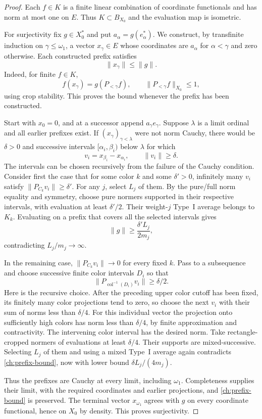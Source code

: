 \begin{proof}
Each $f\in K$ is a finite linear combination of coordinate functionals
and has norm at most one on $E$.  Thus $K\subset B_{X_0}$ and the
evaluation map is isometric.

For surjectivity fix $g\in X_0^*$ and put
$a_\alpha=g(e_\alpha^*)$.  We construct, by transfinite induction on
$\gamma\le\omega_1$, a vector $x_\gamma\in E$ whose coordinates are
$a_\alpha$ for $\alpha<\gamma$ and zero otherwise.  Each constructed
prefix satisfies
\begin{equation}
 \|x_\gamma\|\le\|g\|.
 \label{ch:prefix-bound}
\end{equation}
Indeed, for finite $f\in K$,
\[
 f(x_\gamma)=g(P_{<\gamma}f),\qquad
 \|P_{<\gamma}f\|_{X_0}\le1,
\]
using crop stability.  This proves the bound whenever the prefix has
been constructed.

Start with $x_0=0$, and at a successor append $a_\gamma e_\gamma$.
Suppose $\lambda$ is a limit ordinal and all earlier prefixes exist.
If $(x_\gamma)_{\gamma<\lambda}$ were not norm Cauchy, there would be
$\delta>0$ and successive intervals $[\alpha_i,\beta_i)$ below
$\lambda$ for which
\[
 v_i=x_{\beta_i}-x_{\alpha_i},\qquad \|v_i\|\ge\delta.
\]
The intervals can be chosen recursively from the failure of the
Cauchy condition.  Consider first the case that for some color $k$
and some $\delta'>0$, infinitely many $v_i$ satisfy
$\|P_{C_k}v_i\|\ge\delta'$.  For any $j$, select $L_j$ of them.
By the pure/full norm equality and symmetry, choose pure normers
supported in their respective intervals, with evaluation at least
$\delta'/2$.  Their weight-$j$ Type~I average belongs to $K_k$.
Evaluating on a prefix that covers all the selected intervals gives
\[
 \|g\|\ge\frac{\delta' L_j}{2m_j},
\]
contradicting $L_j/m_j\to\infty$.

In the remaining case, $\|P_{C_k}v_i\|\to0$ for every fixed $k$.
Pass to a subsequence and choose successive finite color intervals
$D_i$ so that
\[
 \|P_{\operatorname{col}^{-1}(D_i)}v_i\|\ge\delta/2.
\]
Here is the recursive choice.  After the preceding upper color cutoff
has been fixed, its finitely many color projections tend to zero, so
choose the next $v_i$ with their sum of norms less than $\delta/4$.
For this individual vector the projection onto sufficiently high colors
has norm less than $\delta/4$, by finite approximation and
contractivity.  The intervening color interval has the desired norm.
Take rectangle-cropped normers of evaluations at least $\delta/4$.
Their supports are mixed-successive.  Selecting $L_j$ of them and
using a mixed Type~I average again contradicts
\eqref{ch:prefix-bound}, now with lower bound $\delta L_j/(4m_j)$.

Thus the prefixes are Cauchy at every limit, including $\omega_1$.
Completeness supplies their limit, with the required coordinates and
earlier projections, and \eqref{ch:prefix-bound} is preserved.  The
terminal vector $x_{\omega_1}$ agrees with $g$ on every coordinate
functional, hence on $X_0$ by density.  This proves surjectivity.
\end{proof}
